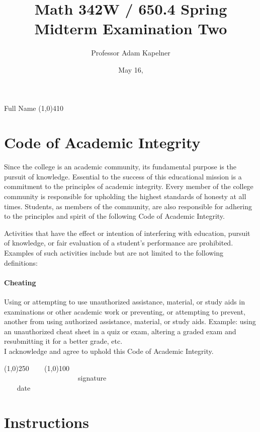 \documentclass[12pt]{article}
\title{Math 342W / 650.4 Spring \the\year \\ Midterm Examination Two}
\author{Professor Adam Kapelner}
\date{May 16, \the\year}
\begin{document}
\maketitle

\noindent Full Name \line(1,0){410}

\thispagestyle{empty}

\section*{Code of Academic Integrity}

\footnotesize
Since the college is an academic community, its fundamental purpose is the pursuit of knowledge. Essential to the success of this educational mission is a commitment to the principles of academic integrity. Every member of the college community is responsible for upholding the highest standards of honesty at all times. Students, as members of the community, are also responsible for adhering to the principles and spirit of the following Code of Academic Integrity.

Activities that have the effect or intention of interfering with education, pursuit of knowledge, or fair evaluation of a student's performance are prohibited. Examples of such activities include but are not limited to the following definitions:

\paragraph{Cheating} Using or attempting to use unauthorized assistance, material, or study aids in examinations or other academic work or preventing, or attempting to prevent, another from using authorized assistance, material, or study aids. Example: using an unauthorized cheat sheet in a quiz or exam, altering a graded exam and resubmitting it for a better grade, etc.
\\

\noindent I acknowledge and agree to uphold this Code of Academic Integrity. \\

\begin{center}
\line(1,0){250} ~~~ \line(1,0){100}\\
~~~~~~~~~~~~~~~~~~~~~signature~~~~~~~~~~~~~~~~~~~~~~~~~~~~~~~~~~~~~~~~~~~~~ date
\end{center}

\normalsize
\vspace{-0.5cm}
\section*{Instructions}
\end{document}
